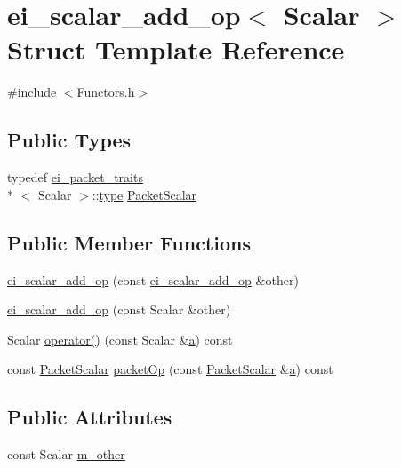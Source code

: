 \hypertarget{structei__scalar__add__op}{\section{ei\-\_\-scalar\-\_\-add\-\_\-op$<$ Scalar $>$ Struct Template Reference}
\label{structei__scalar__add__op}
}


{\ttfamily \#include $<$Functors.\-h$>$}

\subsection*{Public Types}
\begin{DoxyCompactItemize}
\item 
typedef \hyperlink{structei__packet__traits}{ei\-\_\-packet\-\_\-traits}\\*
$<$ Scalar $>$\-::\hyperlink{glext_8h_a7d05960f4f1c1b11f3177dc963a45d86}{type} \hyperlink{structei__scalar__add__op_a6692b8254ccaae051cc773a70742c658}{Packet\-Scalar}
\end{DoxyCompactItemize}
\subsection*{Public Member Functions}
\begin{DoxyCompactItemize}
\item 
\hyperlink{structei__scalar__add__op_ab485c027f7b75fdaddfb2375e3663e56}{ei\-\_\-scalar\-\_\-add\-\_\-op} (const \hyperlink{structei__scalar__add__op}{ei\-\_\-scalar\-\_\-add\-\_\-op} \&other)
\item 
\hyperlink{structei__scalar__add__op_ada787f4e7dcc9055cacf1fa073fd57e2}{ei\-\_\-scalar\-\_\-add\-\_\-op} (const Scalar \&other)
\item 
Scalar \hyperlink{structei__scalar__add__op_a1094de71ef4b6911c8b2ec57e69c09de}{operator()} (const Scalar \&\hyperlink{glext_8h_ac8729153468b5dcf13f971b21d84d4e5}{a}) const 
\item 
const \hyperlink{structei__scalar__add__op_a6692b8254ccaae051cc773a70742c658}{Packet\-Scalar} \hyperlink{structei__scalar__add__op_a5077b86802f8e4c54f99f54d1b4aabe2}{packet\-Op} (const \hyperlink{structei__scalar__add__op_a6692b8254ccaae051cc773a70742c658}{Packet\-Scalar} \&\hyperlink{glext_8h_ac8729153468b5dcf13f971b21d84d4e5}{a}) const 
\end{DoxyCompactItemize}
\subsection*{Public Attributes}
\begin{DoxyCompactItemize}
\item 
const Scalar \hyperlink{structei__scalar__add__op_a1d89fcd4078615cdbeb418f66596bd6f}{m\-\_\-other}
\end{DoxyCompactItemize}


